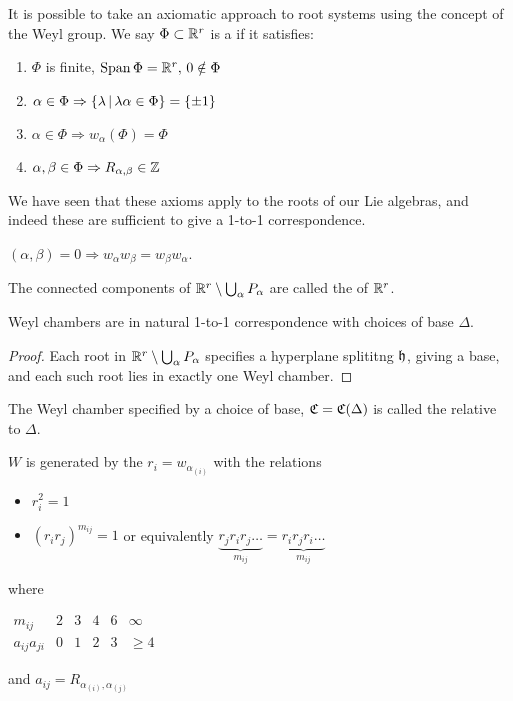 \documentclass{article}
\begin{document}
\begin{remark}
	It is possible to take an axiomatic approach to root systems using the concept of the Weyl group. We say $\Phi \subset \mathbb{R}^r$ is a  if it satisfies:
	\begin{enumerate}
		\item $\Phi$ is finite, $\operatorname{Span}\Phi = \mathbb{R}^r, \, 0 \notin \Phi$ 
		\item $\alpha \in \Phi \Rightarrow \left\{ \lambda \, | \, \lambda\alpha \in \Phi \right\} = \left\{ \pm 1 \right\}$ 
		\item $\alpha \in \Phi \Rightarrow w_\alpha(\Phi) = \Phi$
		\item $\alpha,\beta \in \Phi \Rightarrow R_{\alpha,\beta}  \in \mathbb{Z}$ 
	\end{enumerate}
	We have seen that these axioms apply to the roots of our Lie algebras, and indeed these are sufficient to give a 1-to-1 correspondence. 
\end{remark}

\begin{lemma}
	$(\alpha,\beta)=0 \Rightarrow w_\alpha w_\beta = w_\beta w_\alpha$.
\end{lemma}

\begin{definition}
	The connected components of $\mathbb{R}^r \setminus \bigcup_{\alpha} P_\alpha$ are called the  of $\mathbb{R}^r$.
\end{definition}

\begin{prop}
	Weyl chambers are in natural 1-to-1 correspondence with choices of base $\Delta$. 
\end{prop}
\begin{proof}
	Each root in $\mathbb{R}^r \setminus\bigcup_\alpha P_\alpha$ specifies a hyperplane splititng $\mathfrak{h}$, giving a base, and each such root lies in exactly one Weyl chamber. 
\end{proof}

\begin{definition}
	The Weyl chamber specified by a choice of base, $\mathfrak{C} = \mathfrak{C}(\Delta)$ is called the  relative to $\Delta$.
\end{definition}

\begin{prop}
	$W$ is generated by the $r_i = w_{\alpha_{(i)}}$ with the relations 
	\begin{itemize}
		\item $r_i^2=1$
		\item $(r_i r_j)^{m_{ij}}=1$ or equivalently $\underbrace{r_j r_i r_j \dots}_{m_{ij}} = \underbrace{r_i r_j r_i \dots}_{m_{ij}}$
	\end{itemize}
	where 
	\begin{center}
		$\begin{array}{c||c|c|c|c|c}
		m_{ij} & 2 & 3 & 4 & 6 & \infty \\ \hline
		a_{ij} a_{ji} & 0 & 1 & 2 & 3 & \geq 4
		\end{array}$
	\end{center}
and $a_{ij} = R_{\alpha_{(i)},\alpha_{(j)}}$
\end{prop}
\end{document}
